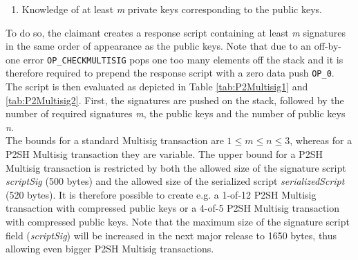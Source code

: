 \begin{enumerate}[label=\arabic*), leftmargin=1cm]
\item Knowledge of at least \textit{m} private keys corresponding to the public keys.
\end{enumerate}

\noindent
To do so, the claimant creates a response script containing at least \textit{m} signatures in the same order of appearance as the public keys. Note that due to an off-by-one error {\tt OP\_CHECKMULTISIG} pops one too many elements off the stack and it is therefore required to prepend the response script with a zero data push {\tt OP\_0}. The script is then evaluated as depicted in Table \ref{tab:P2Multisig1} and \ref{tab:P2Multisig2}. First, the signatures are pushed on the stack, followed by the number of required signatures \textit{m}, the public keys and the number of public keys \textit{n}.~\\

\noindent
The bounds for a standard Multisig transaction are $1 \leq m \leq n \leq 3$, whereas for a P2SH Multisig transaction they are variable. The upper bound for a P2SH Multisig transaction is restricted by both the allowed size of the signature script \textit{scriptSig} (500 bytes) and the allowed size of the serialized script \textit{serializedScript} (520 bytes). It is therefore possible to create e.g. a 1-of-12 P2SH Multisig transaction with compressed public keys or a 4-of-5 P2SH Multisig transaction with compressed public keys. Note that the maximum size of the signature script field (\textit{scriptSig}) will be increased in the next major release to 1650 bytes, thus allowing even bigger P2SH Multisig transactions.

